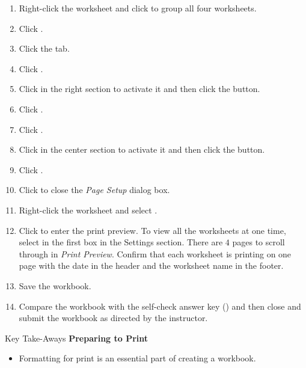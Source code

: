 \begin{enumbox}
\begin{enumerate}
		\item Right-click the  worksheet and click  to group all four worksheets. 
		\item Click .
		\item Click the  tab.
		\item Click .
		\item Click in the right section to activate it and then click the  button.
		\item Click .
		\item Click .
		\item Click in the center section to activate it and then click the  button.
		\item Click .
		\item Click  to close the \textit{Page Setup} dialog box.
		\item Right-click the  worksheet and select .
		\item Click  to enter the print preview. To view all the worksheets at one time, select  in the first box in the Settings section. There are $ 4 $ pages to scroll through in \textit{Print Preview}. Confirm that each worksheet is printing on one page with the date in the header and the worksheet name in the footer.
		\item Save the  workbook.
	
	\item Compare the workbook with the self-check answer key () and then close and submit the  workbook as directed by the instructor.
		
	\end{enumerate}
\end{enumbox}


\begin{center}
	\begin{tkwbox}{Key Take-Aways}
		\textbf{Preparing to Print}
		\\
		\begin{itemize}
			\setlength{\itemsep}{0pt}
			\setlength{\parskip}{0pt}
			\setlength{\parsep}{0pt}
			
			\item Formatting for print is an essential part of creating a workbook.
			
		\end{itemize}
	\end{tkwbox}
\end{center}

